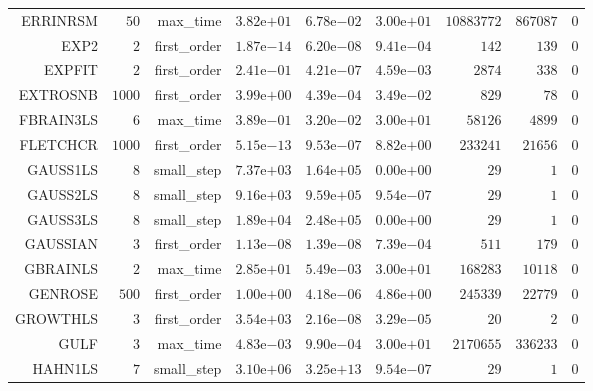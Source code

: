 \begin{longtable}{rrrrrrrrr}
ERRINRSM & \(    50\) & max\_time & \( 3.82\)e\(+01\) & \( 6.78\)e\(-02\) & \( 3.00\)e\(+01\) & \(10883772\) & \(867087\) & \(     0\) \\
EXP2 & \(     2\) & first\_order & \( 1.87\)e\(-14\) & \( 6.20\)e\(-08\) & \( 9.41\)e\(-04\) & \(   142\) & \(   139\) & \(     0\) \\
EXPFIT & \(     2\) & first\_order & \( 2.41\)e\(-01\) & \( 4.21\)e\(-07\) & \( 4.59\)e\(-03\) & \(  2874\) & \(   338\) & \(     0\) \\
EXTROSNB & \(  1000\) & first\_order & \( 3.99\)e\(+00\) & \( 4.39\)e\(-04\) & \( 3.49\)e\(-02\) & \(   829\) & \(    78\) & \(     0\) \\
FBRAIN3LS & \(     6\) & max\_time & \( 3.89\)e\(-01\) & \( 3.20\)e\(-02\) & \( 3.00\)e\(+01\) & \( 58126\) & \(  4899\) & \(     0\) \\
FLETCHCR & \(  1000\) & first\_order & \( 5.15\)e\(-13\) & \( 9.53\)e\(-07\) & \( 8.82\)e\(+00\) & \(233241\) & \( 21656\) & \(     0\) \\
GAUSS1LS & \(     8\) & small\_step & \( 7.37\)e\(+03\) & \( 1.64\)e\(+05\) & \( 0.00\)e\(+00\) & \(    29\) & \(     1\) & \(     0\) \\
GAUSS2LS & \(     8\) & small\_step & \( 9.16\)e\(+03\) & \( 9.59\)e\(+05\) & \( 9.54\)e\(-07\) & \(    29\) & \(     1\) & \(     0\) \\
GAUSS3LS & \(     8\) & small\_step & \( 1.89\)e\(+04\) & \( 2.48\)e\(+05\) & \( 0.00\)e\(+00\) & \(    29\) & \(     1\) & \(     0\) \\
GAUSSIAN & \(     3\) & first\_order & \( 1.13\)e\(-08\) & \( 1.39\)e\(-08\) & \( 7.39\)e\(-04\) & \(   511\) & \(   179\) & \(     0\) \\
GBRAINLS & \(     2\) & max\_time & \( 2.85\)e\(+01\) & \( 5.49\)e\(-03\) & \( 3.00\)e\(+01\) & \(168283\) & \( 10118\) & \(     0\) \\
GENROSE & \(   500\) & first\_order & \( 1.00\)e\(+00\) & \( 4.18\)e\(-06\) & \( 4.86\)e\(+00\) & \(245339\) & \( 22779\) & \(     0\) \\
GROWTHLS & \(     3\) & first\_order & \( 3.54\)e\(+03\) & \( 2.16\)e\(-08\) & \( 3.29\)e\(-05\) & \(    20\) & \(     2\) & \(     0\) \\
GULF & \(     3\) & max\_time & \( 4.83\)e\(-03\) & \( 9.90\)e\(-04\) & \( 3.00\)e\(+01\) & \(2170655\) & \(336233\) & \(     0\) \\
HAHN1LS & \(     7\) & small\_step & \( 3.10\)e\(+06\) & \( 3.25\)e\(+13\) & \( 9.54\)e\(-07\) & \(    29\) & \(     1\) & \(     0\) \\

\end{longtable}
